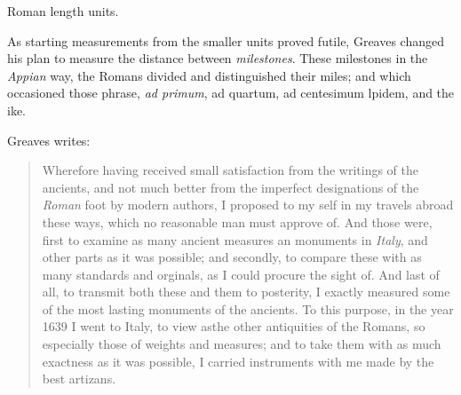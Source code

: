 


\SetInBetween{$\to$}

\begin{table}[htbp]
\begin{conversiontable}
\\
\\
\\
\\
\\
\end{conversiontable}
\caption{Roman length units.}

\end{table}

As starting measurements from the smaller units proved futile, Greaves changed his plan to measure the distance between \textit{milestones}. These milestones in the \textit{Appian} way, the Romans divided and distinguished their miles; and which occasioned those phrase, \textit{ad primum}, ad quartum, ad centesimum lpidem, and the ike.


Greaves writes:


\begin{quotation}
Wherefore having received small satisfaction from the writings of the ancients, and not much better from the imperfect designations of the \textit{Roman} foot by modern authors, I proposed to my self in my travels abroad these ways, which no
reasonable man must approve of. And those were, first to examine as many ancient measures an monuments in \textit{Italy}, and other parts as it was possible; and secondly, to compare these with as many standards and orginals, as I could procure the sight of. And last of all, to transmit both these and them to posterity, I exactly measured some of the most lasting monuments of the ancients. To this purpose, in the year 1639 I went to Italy, to view asthe other antiquities of the Romans, so especially those of weights and measures; and to take them with as much exactness as it was possible, I carried instruments with me made by the best artizans. 

\end{quotation}

